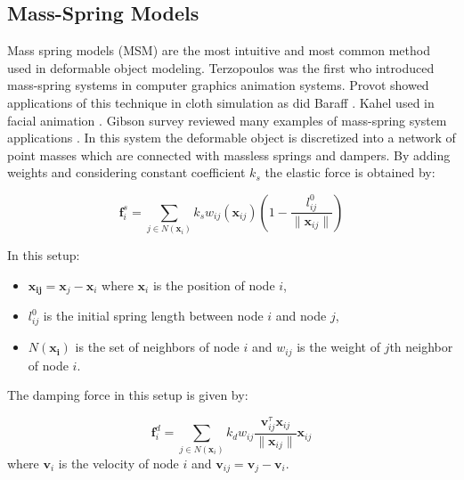 \subsection{Mass-Spring Models}
Mass spring models (MSM) are the most intuitive and most common method used in deformable object modeling.
Terzopoulos \etal \cite{terzopoulos1988modeling, terzopoulos1987elastically} was the first who introduced mass-spring systems in 
computer graphics animation systems. Provot \etal showed applications of this technique in cloth simulation \cite{provot1995deformation}
as did Baraff \etal \cite{baraff1998large}. Kahel \etal used in facial animation \cite{kahler2001geometry}. 
Gibson \etal survey reviewed many examples of mass-spring system applications \cite{Gibson1997a}. In this system the deformable object
is discretized into a network of point masses which are connected with massless springs and dampers. By adding weights and considering
constant coefficient $k_s$ the elastic force is obtained by:

\begin{equation}
 \boldsymbol{f}^s_i = \sum_{j \in N(\boldsymbol{x}_i)} k_s w_{ij}(\boldsymbol{x}_{ij})(1-\frac{l^0_{ij}}{\| \boldsymbol{x}_{ij} \|})
\end{equation}

In this setup:

\begin{itemize}
 \item $\boldsymbol{x_{ij}} = \boldsymbol{x}_j - \boldsymbol{x}_i$ where $\boldsymbol{x}_i$ is the position of node $i$, 
 \item $l^0_{ij}$ is the initial spring length between node $i$ and node $j$,
 \item $N(\boldsymbol{x_i})$ is the set of neighbors of node $i$ and $w_{ij}$ is the weight of $j$th neighbor of node $i$.
\end{itemize}

The damping force in this setup is given by:

\begin{equation}
 \boldsymbol{f}^d_i = \sum_{j \in N(\boldsymbol{x}_i)} k_d w_{ij} \frac{\boldsymbol{v}^\tau_{ij} \boldsymbol{x}_{ij} }{\|\boldsymbol{x}_{ij} \|} \boldsymbol{x}_{ij}
\end{equation}
where $\boldsymbol{v}_i$ is the velocity of node $i$ and $\boldsymbol{v}_{ij} = \boldsymbol{v}_j - \boldsymbol{v}_i$.

